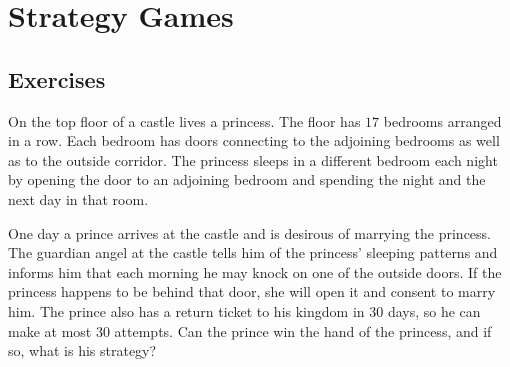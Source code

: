 \chapter{Strategy Games}
\section*{Exercises}
\begin{prbm}
On the top floor of a castle lives a princess. The floor has $17$ bedrooms arranged in a row. Each bedroom has doors connecting to the adjoining bedrooms as well as to the outside corridor. The princess sleeps in a different bedroom each night by opening the door to an adjoining bedroom and spending the night and the next day in that room.

One day a prince arrives at the castle and is desirous of marrying the princess. The guardian angel at the castle tells him of the princess' sleeping patterns and informs him that each morning he may knock on one of the outside doors. If the princess happens to be behind that door, she will open it and consent to marry him. The prince also has a return ticket to his kingdom in $30$ days, so he can make at most $30$ attempts. Can the prince win the hand of the princess, and if so, what is his strategy?
\end{prbm}

